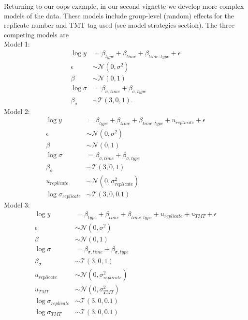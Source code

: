 \documentclass[12pt,english, journal=jpr, layout=twocolumn]{article}
\begin{document}
Returning to our oops example, in our second vignette we develop more complex models of the data. These models include group-level (random) effects for the replicate number and TMT tag used (see model strategies section). The three competing models are
\\
Model 1:
\begin{equation}
	\begin{split}
		\log y &= \beta_{type} + \beta_{time} + \beta_{time:type} + \epsilon\\
		\epsilon &\sim \mathcal{N}(0, \sigma^2)\\
		\beta &\sim \mathcal{N}(0, 1)\\
		\log \sigma &=  \beta_{\sigma, time} + \beta_{\sigma, type} \\
		\beta_{\sigma} &\sim \mathcal{T}(3, 0 , 1).
	\end{split}
\end{equation}
Model 2:
\begin{equation}
	\begin{split}
		\log y &= \beta_{type} + \beta_{time} + \beta_{time:type} + u_{replicate} +  \epsilon\\
		\epsilon &\sim \mathcal{N}(0, \sigma^2)\\
		\beta &\sim \mathcal{N}(0, 1)\\
		\log \sigma &=  \beta_{\sigma, time} + \beta_{\sigma, type}\\
		\beta_{\sigma} &\sim \mathcal{T}(3, 0 , 1)\\
		u_{replicate} &  \sim\mathcal{N}(0, \sigma^2_{replicate})\\
		\log \sigma_{replicate} & \sim \mathcal{T}(3, 0 , 0.1)
	\end{split}
\end{equation}
Model 3:
\begin{equation}
	\begin{split}
		\log y &= \beta_{type} + \beta_{time} + \beta_{time:type} + u_{replicate} + u_{TMT} +  \epsilon\\
		\epsilon &\sim \mathcal{N}(0, \sigma^2)\\
		\beta &\sim \mathcal{N}(0, 1)\\
		\log \sigma &=  \beta_{\sigma, time} + \beta_{\sigma, type}\\
		\beta_{\sigma} &\sim \mathcal{T}(3, 0 , 1)\\
		u_{replicate} & \sim \mathcal{N}(0, \sigma^2_{replicate})\\
		u_{TMT} & \sim \mathcal{N}(0, \sigma^2_{TMT})\\
		\log \sigma_{replicate} &\sim \mathcal{T}(3, 0 , 0.1)\\
		\log \sigma_{TMT} &\sim \mathcal{T}(3, 0 , 0.1)
	\end{split}
\end{equation}
\end{document}
